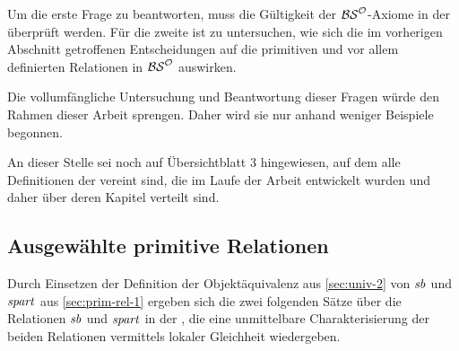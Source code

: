     Um die erste Frage %
    zu beantworten, muss die Gültigkeit der $\mathcal{BS}^{\mathcal{O}}$-Axiome in der \strukt überprüft werden.
    Für die zweite ist zu untersuchen, wie sich die im vorherigen Abschnitt getroffenen Entscheidungen auf die primitiven und vor allem definierten Relationen in $\mathcal{BS}^{\mathcal{O}}$ auswirken.

    Die vollumfängliche Untersuchung und Beantwortung dieser Fragen würde den Rahmen dieser Arbeit sprengen. 
    Daher wird sie nur anhand weniger Beispiele begonnen.
    
    An dieser Stelle sei noch auf Übersichtblatt 3 hingewiesen, auf dem alle Definitionen der \strukt vereint sind, die im Laufe der Arbeit entwickelt wurden und daher über deren Kapitel verteilt sind.
    

\subsection{Ausgewählte primitive Relationen}
    Durch Einsetzen der Definition der Objektäquivalenz aus \ref{sec:univ-2} von $\mathit{sb}$ und $\mathit{spart}$ aus \ref{sec:prim-rel-1} ergeben sich die zwei folgenden Sätze über die Relationen $\mathit{sb}$ und $\mathit{spart}$ in der \strukt, die eine unmittelbare Charakterisierung der beiden Relationen vermittels lokaler Gleichheit wiedergeben.

